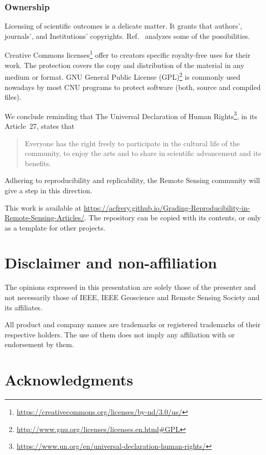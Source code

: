 \documentclass[journal,twoside]{IEEEtran}
\begin{document}
\subsubsection{Ownership}\label{Sec:Ownership}

Licensing of scientific outcomes is a delicate matter.
It grants that authors', journals', and Institutions' copyrights.
Ref.~\cite{TheLegalFrameworkforReproducibleScientificResearchLicensingandCopyright} analyzes some of the possibilities.  

Creative Commons licenses\footnote{\url{https://creativecommons.org/licenses/by-nd/3.0/us/}} offer to creators specific royalty-free uses for their work. 
The protection covers the copy and distribution of the material in any medium or format. 
GNU General Public License (GPL)\footnote{\url{http://www.gnu.org/licenses/licenses.en.html#GPL}} is commonly used nowadays by most CNU programs to protect software (both, source and compiled files). 

We conclude reminding that The Universal Declaration of Human Rights\footnote{\url{https://www.un.org/en/universal-declaration-human-rights/}}, in its Article~27, states that
\begin{quote}
	Everyone has the right freely to participate in the cultural life of the community, to enjoy the arts and to share in scientific advancement and its benefits.
\end{quote}
Adhering to reproducibility and replicability, the Remote Sensing community will give a step in this direction.

This work is available at \url{https://acfrery.github.io/Grading-Reproducibility-in-Remote-Sensing-Articles/}.
The repository can be copied with its contents, or only as a template for other projects.

\section*{Disclaimer and non-affiliation}

The opinions expressed in this presentation are solely those of the presenter and not necessarily those of IEEE, IEEE Geoscience and Remote Sensing Society and its affiliates.

All product and company names are trademarks or registered trademarks of their respective holders. The use of them does not imply any affiliation with or endorsement by them. 

\section*{Acknowledgments}
\end{document}
